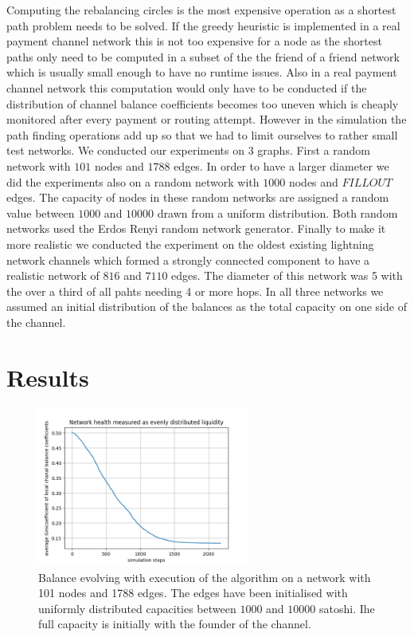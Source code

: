 \documentclass[a4paper]{paper}
\begin{document}
Computing the rebalancing circles is the most expensive operation as a shortest path problem needs to be solved.
If the greedy heuristic is implemented in a real payment channel network this is not too expensive for a node as the shortest paths only need to be computed in a subset of the the friend of a friend network which is usually small enough to have no runtime issues.
Also in a real payment channel network this computation would only have to be conducted if the distribution of channel balance coefficients becomes too uneven which is cheaply monitored after every payment or routing attempt.
However in the simulation the path finding operations add up so that we had to limit ourselves to rather small test networks.
We conducted our experiments on 3 graphs.
First a random network with $101$ nodes and $1788$ edges.
In order to have a larger diameter we did the experiments also on a random network with $1000$ nodes and $FILLOUT$ edges.
The capacity of nodes in these random networks are assigned a random value between $1000$ and $10000$ drawn from a uniform distribution.
Both random networks used the Erdos Renyi random network generator.
Finally to make it more realistic we conducted the experiment on the oldest existing lightning network channels which formed a strongly connected component to have a realistic network of $816$ and $7110$ edges.
The diameter of this network was 5 with the over a third of all pahts needing 4 or more hops.
In all three networks we assumed an initial distribution of the balances as the total capacity on one side of the channel.


\section{Results}\label{sec:results}

\begin{figure}
 \centering
 \includegraphics[width=7cm]{code/results/routabilityTest/1574847007_figure.png}
 \caption{Balance evolving with execution of the algorithm on a network with 101 nodes and 1788 edges. The edges have been initialised with uniformly distributed capacities between $1000$ and $10000$ satoshi. Ihe full capacity is initially with the founder of the channel.}
 \label{fig:healthovertime}
\end{figure}
\end{document}
